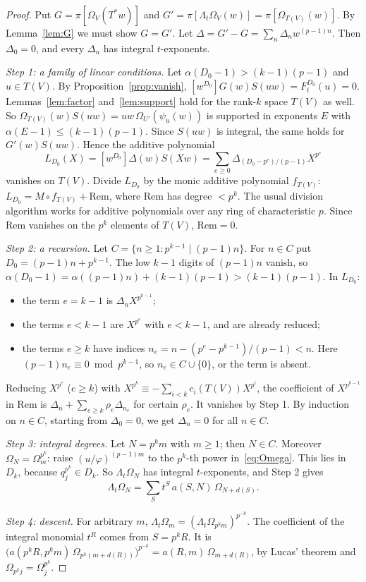 \documentclass[11pt]{amsart}
\theoremstyle{definition}
\theoremstyle{remark}
\newcommand{\Dk}{D_k}
\newcommand{\coef}[1]{\left[#1\right]}
\begin{document}
\begin{proof}
Put $G=\pi[\Omega_V(T^*w)]$ and $G'=\pi[\Lambda_t\Omega_V(w)]=\pi[\Omega_{T(V)}(w)]$.
By Lemma~\ref{lem:G} we must show $G=G'$.  Let $\Delta=G'-G=\sum_n\Delta_nw^{(p-1)n}$.
Then $\Delta_0=0$, and every $\Delta_n$ has integral $t$-exponents.

\emph{Step 1: a family of linear conditions.}  Let $\alpha(D_0-1)>(k-1)(p-1)$ and
$u\in T(V)$.  By Proposition~\ref{prop:vanish},
$\coef{w^{D_0}}G(w)S(uw)=F^{D_0}_t(u)=0$.  Lemmas~\ref{lem:factor}
and~\ref{lem:support} hold for the rank-$k$ space $T(V)$ as well.  So
$\Omega_{T(V)}(w)S(uw)=uw\,\Omega_{U'}(\psi_u(w))$ is supported in exponents $E$
with $\alpha(E-1)\le(k-1)(p-1)$.  Since $S(uw)$ is integral, the same holds for
$G'(w)S(uw)$.  Hence the additive polynomial
\[
  L_{D_0}(X)=\coef{w^{D_0}}\Delta(w)S(Xw)=\sum_{e\ge0}\Delta_{(D_0-p^e)/(p-1)}X^{p^e}
\]
vanishes on $T(V)$.  Divide $L_{D_0}$ by the monic additive polynomial $f_{T(V)}$:
$L_{D_0}=M\circ f_{T(V)}+\mathrm{Rem}$, where $\mathrm{Rem}$ has degree $<p^k$.
The usual division algorithm works for additive polynomials over any ring of
characteristic $p$.  Since $\mathrm{Rem}$ vanishes on the $p^k$ elements of
$T(V)$, $\mathrm{Rem}=0$.

\emph{Step 2: a recursion.}  Let $C=\{n\ge1:p^{k-1}\mid(p-1)n\}$.  For $n\in C$
put $D_0=(p-1)n+p^{k-1}$.  The low $k-1$ digits of $(p-1)n$ vanish, so
$\alpha(D_0-1)=\alpha((p-1)n)+(k-1)(p-1)>(k-1)(p-1)$.  In
$L_{D_0}$:
\begin{itemize}
\item the term $e=k-1$ is $\Delta_nX^{p^{k-1}}$;
\item the terms $e<k-1$ are $X^{p^e}$ with $e<k-1$, and are already reduced;
\item the terms $e\ge k$ have indices
  $n_e=n-(p^e-p^{k-1})/(p-1)<n$.  Here $(p-1)n_e\equiv0\bmod p^{k-1}$, so
  $n_e\in C\cup\{0\}$, or the term is absent.
\end{itemize}
Reducing $X^{p^e}$ ($e\ge k$) with $X^{p^k}\equiv-\sum_{i<k}c_i(T(V))X^{p^i}$, the
coefficient of $X^{p^{k-1}}$ in $\mathrm{Rem}$ is $\Delta_n+\sum_{e\ge k}\rho_e\Delta_{n_e}$
for certain $\rho_e$.  It vanishes by Step 1.  By induction on $n\in C$, starting
from $\Delta_0=0$, we get $\Delta_n=0$ for all $n\in C$.

\emph{Step 3: integral degrees.}  Let $N=p^km$ with $m\ge1$; then $N\in C$.
Moreover $\Omega_N=\Omega_m^{p^k}$: raise $(u/\varphi)^{(p-1)m}$ to the
$p^k$-th power in~\eqref{eq:Omega}.  This lies in $\Dk$, because
$q_j^{p^k}\in\Dk$.  So $\Lambda_t\Omega_N$ has integral $t$-exponents, and
Step 2 gives
\[
  \Lambda_t\Omega_N=\sum_St^S\,a(S,N)\,\Omega_{N+d(S)} .
\]

\emph{Step 4: descent.}  For arbitrary $m$,
$\Lambda_t\Omega_m=(\Lambda_t\Omega_{p^km})^{p^{-k}}$.  The coefficient of the
integral monomial $t^R$ comes from $S=p^kR$.  It is
$\bigl(a(p^kR,p^km)\,\Omega_{p^k(m+d(R))}\bigr)^{p^{-k}}=a(R,m)\,\Omega_{m+d(R)}$,
by Lucas' theorem and $\Omega_{p^kj}=\Omega_j^{p^k}$.
\end{proof}
\end{document}
